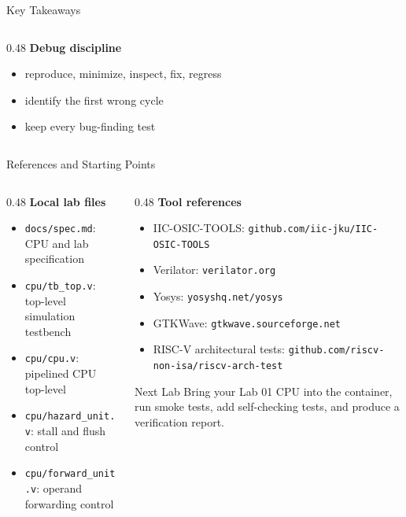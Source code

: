 \documentclass[aspectratio=169,10pt]{beamer}
\begin{document}
\begin{frame}{Key Takeaways}
\begin{columns}[T]
\begin{column}{0.48\textwidth}
      \vspace{0.6em}
      \textbf{Debug discipline}
      \begin{itemize}
        \item reproduce, minimize, inspect, fix, regress
        \item identify the first wrong cycle
        \item keep every bug-finding test
      \end{itemize}
    \end{column}
  \end{columns}
\end{frame}

\begin{frame}{References and Starting Points}
  \begin{columns}[T]
    \begin{column}{0.48\textwidth}
      \textbf{Local lab files}
      \begin{itemize}
        \item \texttt{docs/spec.md}: CPU and lab specification
        \item \texttt{cpu/tb\_top.v}: top-level simulation testbench
        \item \texttt{cpu/cpu.v}: pipelined CPU top-level
        \item \texttt{cpu/hazard\_unit.v}: stall and flush control
        \item \texttt{cpu/forward\_unit.v}: operand forwarding control
      \end{itemize}
    \end{column}
    \begin{column}{0.48\textwidth}
      \textbf{Tool references}
      \begin{itemize}
        \item IIC-OSIC-TOOLS: \texttt{github.com/iic-jku/IIC-OSIC-TOOLS}
        \item Verilator: \texttt{verilator.org}
        \item Yosys: \texttt{yosyshq.net/yosys}
        \item GTKWave: \texttt{gtkwave.sourceforge.net}
        \item RISC-V architectural tests: \texttt{github.com/riscv-non-isa/riscv-arch-test}
      \end{itemize}

      \vspace{0.6em}
      \begin{exampleblock}{Next Lab}
        Bring your Lab 01 CPU into the container, run smoke tests, add self-checking tests, and produce a verification report.
      \end{exampleblock}
    \end{column}
  \end{columns}
\end{frame}
\end{document}
